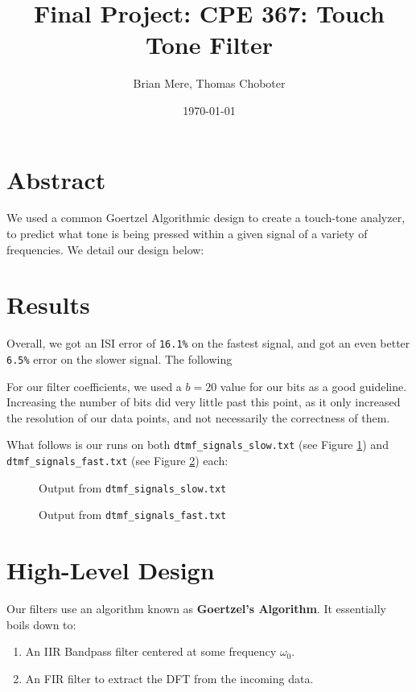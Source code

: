 \documentclass[12pt]{article}
\title{Final Project: CPE 367: Touch Tone Filter}
\author{Brian Mere, Thomas Choboter}
\date{\today}
\begin{document}
 

\inserttitlepage 

\section*{Abstract}

We used a common Goertzel Algorithmic design to create a touch-tone 
analyzer, to predict what tone is being pressed within a given 
signal of a variety of frequencies. We detail our design below:

\section*{Results}

Overall, we got an ISI error of \texttt{16.1\%} on the fastest signal, and 
got an even better \texttt{6.5\%} error on the slower signal. The following 

For our filter coefficients, we used a $b = 20$ value for our 
bits as a good guideline. Increasing the number of bits did very 
little past this point, as it only increased the resolution of 
our data points, and not necessarily the correctness of them. 

What follows is our runs on both \texttt{dtmf\_signals\_slow.txt}
(see Figure \ref{fig:slow})
and \texttt{dtmf\_signals\_fast.txt} 
(see Figure \ref{fig:fast})
each:

\begin{figure}
    \centering 
    
    \caption{Output from \texttt{dtmf\_signals\_slow.txt}}
    \label{fig:slow}
\end{figure}

\begin{figure}
    \centering 
    
    \caption{Output from \texttt{dtmf\_signals\_fast.txt}}
    \label{fig:fast}
\end{figure}


\section*{High-Level Design}

Our filters use an algorithm known as \textbf{Goertzel's Algorithm}.
It essentially boils down to:

\begin{enumerate}
    \item An IIR Bandpass filter centered at some frequency $\omega_0$. 
    \item An FIR filter to extract the DFT from the incoming data.
\end{enumerate}
\end{document}
